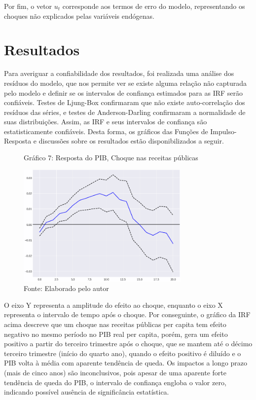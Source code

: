 \documentclass[a4paper, 12pt, openany, oneside, brazil]{abntex2}
\begin{document}
Por fim, o vetor $u_t$ corresponde aos termos de erro do modelo, representando os choques não explicados pelas variáveis endógenas.



\chapter{Resultados}
Para averiguar a confiabilidade dos resultados, foi realizada uma análise dos resíduos do modelo, que nos permite ver se existe alguma relação não capturada pelo modelo e definir se os intervalos de confiança estimados para as IRF serão confiáveis. Testes de Ljung-Box confirmaram que não existe auto-correlação dos resíduos das séries, e testes de Anderson-Darling confirmaram a normalidade de suas distribuições. Assim, as IRF e seus intervalos de confiança são estatisticamente confiáveis. Desta forma, os gráficos das Funções de Impulso-Resposta e discussões sobre os resultados estão disponibilizados a seguir.


\begin{figure}[h!]
	\caption*{Gráfico 7: Resposta do PIB, Choque nas receitas públicas}
	\includegraphics[width=0.75\textwidth]{resultados/irf_revenue_gdp}
	\caption*{Fonte: Elaborado pelo autor}
\end{figure}

O eixo Y representa a amplitude do efeito ao choque, enquanto o eixo X representa o intervalo de tempo após o choque. Por conseguinte, o gráfico da IRF acima descreve que um choque nas receitas públicas per capita tem efeito negativo no mesmo período no PIB real per capita, porém, gera um efeito positivo a partir do terceiro trimestre após o choque, que se mantem até o décimo terceiro trimestre (início do quarto ano), quando o efeito positivo é diluído e o PIB volta à média com aparente tendência de queda. Os impactos a longo prazo (mais de cinco anos) são inconclusivos, pois apesar de uma aparente forte tendência de queda do PIB, o intervalo de confiança engloba o valor zero, indicando possível ausência de significância estatística.
\end{document}
